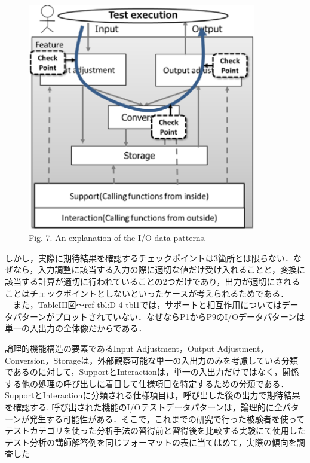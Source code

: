 \documentclass[a4paper,11pt]{jreport}
\begin{document}
   \begin{figure}[htbp]
  \begin{center}
  \includegraphics[width=10cm]{./image/D-4-Fig7.png}
  \caption{Fig. 7. An explanation of the I/O data patterns.}
  \label{fig:D-4-Fig7}
  \end{center}
   \end{figure}


しかし，実際に期待結果を確認するチェックポイントは3箇所とは限らない．なぜなら，入力調整に該当する入力の際に適切な値だけ受け入れることと，変換に該当する計算が適切に行われていることの2つだけであり，出力が適切にされることはチェックポイントとしないといったケースが考えられるためである．
　また，TableIII図〜ref {tbl:D-4-tbl1}では，サポートと相互作用についてはデータパターンがプロットされていない．なぜならP1からP9のI/Oデータパターンは単一の入出力の全体像だからである．


論理的機能構造の要素であるInput Adjustment，Output Adjustment，Conversion，Storageは，外部観察可能な単一の入出力のみを考慮している分類であるのに対して，SupportとInteractionは，単一の入出力だけではなく，関係する他の処理の呼び出しに着目して仕様項目を特定するための分類である．
SupportとInteractionに分類される仕様項目は，呼び出した後の出力で期待結果を確認する. 呼び出された機能のI/Oテストデータパターンは，論理的に全パターンが発生する可能性がある．そこで，これまでの研究で行った被験者を使ってテストカテゴリを使った分析手法の習得前と習得後を比較する実験にて使用したテスト分析の講師解答例を同じフォーマットの表に当てはめて，実際の傾向を調査した
\end{document}
